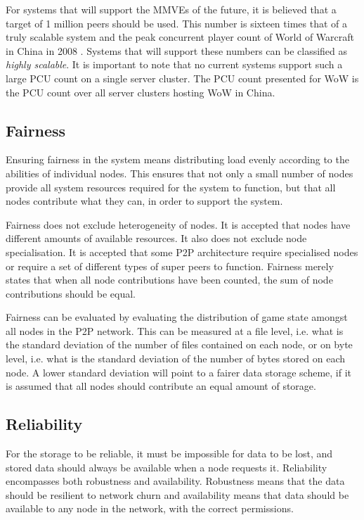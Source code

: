 For systems that will support the MMVEs of the future, it is believed that a target of 1 million peers should be used. This number is sixteen times that of a truly scalable system and the peak concurrent player count of World of Warcraft in China in 2008 \cite{WoW_china_pcu}. Systems that will support these numbers can be classified as \emph{highly scalable}. It is important to note that no current systems support such a large PCU count on a single server cluster. The PCU count presented for WoW is the PCU count over all server clusters hosting WoW in China.

\subsection{Fairness}
Ensuring fairness in the system means distributing load evenly according to the abilities of individual nodes. This ensures that not only a small number of nodes provide all system resources required for the system to function, but that all nodes contribute what they can, in order to support the system.

Fairness does not exclude heterogeneity of nodes. It is accepted that nodes have different amounts of available resources. It also does not exclude node specialisation. It is accepted that some P2P architecture require specialised nodes or require a set of different types of super peers to function. Fairness merely states that when all node contributions have been counted, the sum of node contributions should be equal.

Fairness can be evaluated by evaluating the distribution of game state amongst all nodes in the P2P network. This can be measured at a file level, i.e. what is the standard deviation of the number of files contained on each node, or on byte level, i.e. what is the standard deviation of the number of bytes stored on each node. A lower standard deviation will point to a fairer data storage scheme, if it is assumed that all nodes should contribute an equal amount of storage.

\subsection{Reliability}

For the storage to be reliable, it must be impossible for data to be lost, and stored data should always be available when a node requests it.
Reliability encompasses both robustness and availability. Robustness means that the data should be resilient to network churn and availability means
that data should be available to any node in the network, with the correct permissions.

